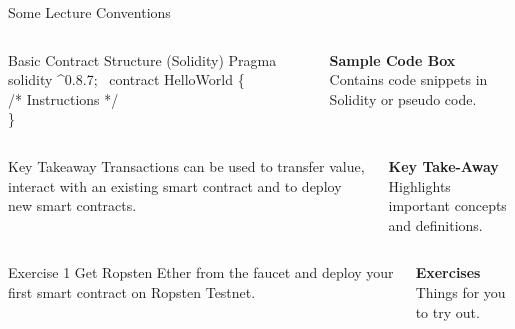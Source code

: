 \documentclass[handout]{beamer}
\begin{document}
\begin{frame}{Some Lecture Conventions}

	\begin{columns}[T]
		\begin{column}{0.45\textwidth}
			\vspace{-1em}
			\begin{samplecode}{Basic Contract Structure (Solidity)}
				Pragma solidity  \textasciicircum 0.8.7; \
				contract HelloWorld \{ \\
				\color{softanthracite} /* Instructions */ \\
				\color{black} \}
			\end{samplecode}			
		\end{column} %

		\begin{column}{0.5\textwidth}
			\textbf{Sample Code Box}\\
			Contains code snippets in Solidity or pseudo code.
		\end{column}
	\end{columns}

\vspace{2.5em}

	\begin{columns}[T]
		\begin{column}{0.45\textwidth}
			\vspace{-0.8em}
			\begin{keytakeaway}{Key Takeaway}
				Transactions can be used to transfer value, interact with an existing smart contract and to deploy new smart contracts.
			\end{keytakeaway}			
		\end{column}
		
		\begin{column}{0.5\textwidth}
			\textbf{Key Take-Away}\\
			Highlights important concepts and definitions.
		\end{column}
	\end{columns}

\vspace{2.5em}

	\begin{columns}[T]
		\begin{column}{0.45\textwidth}
			\vspace{-0.9em}
			\begin{exercise}{Exercise 1}
				Get Ropsten Ether from the faucet and deploy your first smart contract on Ropsten Testnet.
			\end{exercise}					
		\end{column}
		\begin{column}{0.5\textwidth}
		\textbf{Exercises}\\
			Things for you to try out.
		\end{column}
	\end{columns}

\end{frame}
\end{document}
